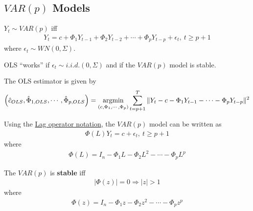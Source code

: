 \documentclass[11pt]{elegantbook}
\newcommand{\argmin}{\operatornamewithlimits{argmin}}
\begin{document}
\subsection{$VAR(p)$ Models}
\begin{definition}
    $Y_t\sim VAR(p)$ iff
    \begin{equation}
        \begin{aligned}
            Y_t=c+\Phi_1 Y_{t-1}+\Phi_2 Y_{t-2}+\cdots+\Phi_p Y_{t-p}+\epsilon_t,\ t\geq p+1
        \end{aligned}
        \nonumber
    \end{equation}
    where $\epsilon_t\sim WN(0,\Sigma)$.
\end{definition}
\begin{lemma}
    OLS ``works'' if $\epsilon_t\sim{i.i.d.}(0,\Sigma)$ and if the $VAR(p)$ model is stable.
\end{lemma}
The OLS estimator is given by
\begin{equation}
    \begin{aligned}
        \left(\hat{c}_{OLS},\hat{\Phi}_{1,OLS},\cdots,\hat{\Phi}_{p,OLS}\right)=\argmin_{\left(c,\Phi_1,\cdots,\Phi_p\right)} \sum_{t=p+1}^T \|Y_t-c-\Phi_1 Y_{t-1}-\cdots-\Phi_p Y_{t-p}\|^2
    \end{aligned}
    \nonumber
\end{equation}

Using the \underline{Lag operator notation}, the $VAR(p)$ model can be written as
\begin{equation}
    \begin{aligned}
        \Phi(L)Y_t=c+\epsilon_t,\ t\geq p+1
    \end{aligned}
    \nonumber
\end{equation}
where
\begin{equation}
    \begin{aligned}
        \Phi(L)=I_n-\Phi_1 L-\Phi_2 L^2-\cdots-\Phi_p L^p
    \end{aligned}
    \nonumber
\end{equation}

\begin{definition}
    The $VAR(p)$ is \textbf{stable} iff
    \begin{equation}
        \begin{aligned}
            |\Phi(z)|=0 \Rightarrow |z|>1
        \end{aligned}
        \nonumber
    \end{equation}
    where
    \begin{equation}
        \begin{aligned}
            \Phi(z)=I_n-\Phi_1 z-\Phi_2 z^2-\cdots-\Phi_p z^p
        \end{aligned}
        \nonumber
    \end{equation}
\end{definition}
\end{document}
